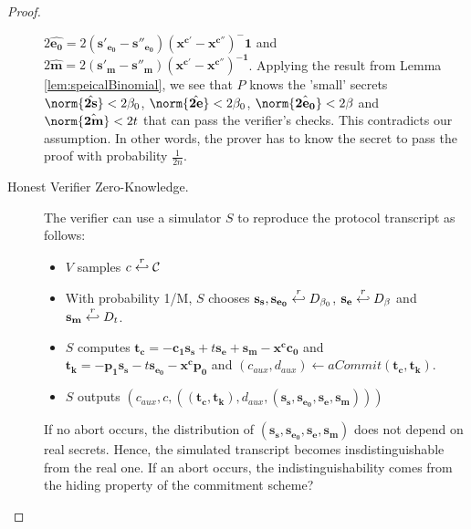 \begin{proof}
\begin{description}
    $2\hat{\mathbf{e_0}} = 2\mathbf{(s'_{e_0}-s''_{e_0})(x^{c'} -
      x^{c''})^-1}$ and $2\hat{\mathbf{m}}=2\mathbf{(s'_m -
      s''_m)(x^{c'} - x^{c''})^{-1}}$. Applying the result from Lemma
    \ref{lem:speicalBinomial}, we see that $P$ knows the 'small' secrets
    $\norm{\hat{\mathbf{2s}}} < 2\beta_0$, $\norm{\hat{\mathbf{2e}}} <
    2\beta_0$, $\norm{\hat{\mathbf{2e_0}}} < 2\beta$ and
    $\norm{\hat{\mathbf{2m}}} < 2t$ that can pass the verifier's checks.
    This contradicts our assumption. In other words, the prover has to
    know the secret to pass the proof with probability
    $\frac{1}{2n}$.
  \item [Honest Verifier Zero-Knowledge.] The verifier can use a
    simulator $S$ to reproduce the
    protocol transcript as follows:
    \begin{itemize}
    \item $V$ samples $c \stackrel{r}{\hookleftarrow} \mathcal{C}$
    \item With probability 1/M, $S$ chooses $\mathbf{s_s, s_{e_0}}
      \stackrel{r}{\hookleftarrow} D_{\beta_0}$, $\mathbf{s_e} \stackrel{r}{\hookleftarrow}
      D_{\beta}$ and $\mathbf{s_m} \stackrel{r}{\hookleftarrow} D_t$.
    \item $S$
      computes $\mathbf{t_c} = \mathbf{-c_1s_s} + t\mathbf{s_e} +
      \mathbf{s_m} - \mathbf{x^cc_0}$ and $\mathbf{t_k} =
      -\mathbf{p_1s_s} -t\mathbf{s_{e_0}} - \mathbf{x^cp_0}$ and
      $(c_{aux}, d_{aux}) \leftarrow aCommit(\mathbf{t_c,t_k})$.
    \item $S$ outputs $(c_{aux}, c, (\mathbf{(t_c,t_k)},
      d_{aux},(\mathbf{s_s,s_{e_0},s_e,s_m})))$
    \end{itemize}
    If no abort occurs, the distribution of $\mathbf{(s_s, s_{e_0}, s_e,
      s_m)}$ does not depend on real secrets. Hence, the simulated
    transcript becomes insdistinguishable from the real one. If an abort
    occurs, the indistinguishability comes from the hiding property of
    the commitment scheme?

  \end{description}
\end{proof}

